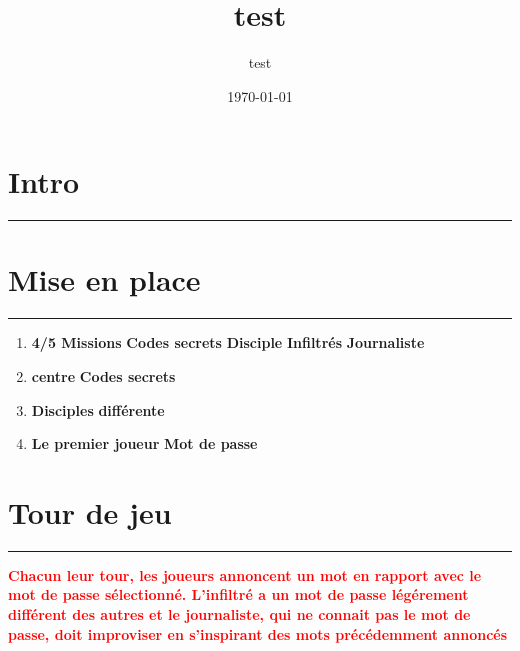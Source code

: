\documentclass{article}%
\title{test}%
\author{test}%
\date{\today}%
\begin{document}
%
\normalsize%
\maketitle\thispagestyle{header}%
\pagestyle{header}%
\sectionfont{\color{blue}}%
\subsectionfont{\color{blue}}%
\subsubsectionfont{\color{blue}}%
\section{ Intro
}%
\label{sec:Intro}%
\textcolor{blue}{\rule{18cm}{0.07cm}}\break

%
\sectionfont{\color{mygreen}}%
\subsectionfont{\color{mygreen}}%
\subsubsectionfont{\color{mygreen}}%
\section{ Mise en place
}%
\label{sec:Miseenplace}%
\textcolor{mygreen}{\rule{18cm}{0.07cm}}\break%
\begin{enumerate}%
\item%
%
\textcolor{mygreen}{%
\textbf{4/5 Missions}%
}%
\textcolor{mygreen}{%
\textbf{Codes secrets}%
}%
\textit{ }%
\textcolor{mygreen}{%
\textbf{Disciple}%
}%
\textcolor{mygreen}{%
\textbf{ Infiltrés}%
}%
\textit{ }%
\textcolor{mygreen}{%
\textbf{Journaliste}%
}%
\textit{ }%
\item%
%
\textcolor{mygreen}{%
\textbf{centre}%
}%
\textit{ }%
\textcolor{mygreen}{%
\textbf{Codes secrets}%
}%
\item%
%
\textcolor{mygreen}{%
\textbf{Disciples}%
}%
\textit{ }%
\textcolor{mygreen}{%
\textbf{différente}%
}%
\item%
%
\textcolor{mygreen}{%
\textbf{Le premier joueur}%
}%
\textit{ }%
\textcolor{mygreen}{%
\textbf{Mot de passe}%
}%
\textit{ }%
\end{enumerate}

%
\sectionfont{\color{red}}%
\subsectionfont{\color{red}}%
\subsubsectionfont{\color{red}}%
\section{ Tour de jeu
}%
\label{sec:Tourdejeu}%
\textcolor{red}{\rule{18cm}{0.07cm}}\break%
\textcolor{red}{%
\textbf{Chacun leur tour, les joueurs annoncent un mot en rapport avec le mot de passe sélectionné. L'infiltré a un mot de passe légérement différent des autres et le journaliste, qui ne connait pas le mot de passe, doit improviser en s'inspirant des mots précédemment annoncés}%
}
\end{document}
